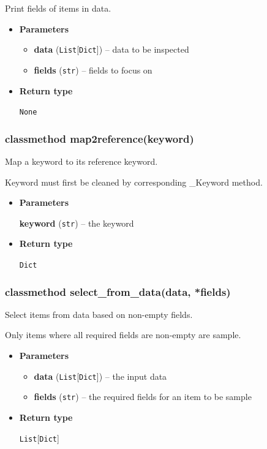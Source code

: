 Print fields of items in data.

\begin{itemize}
\item
  \textbf{Parameters}

  \begin{itemize}
  \item
    \textbf{data} (\texttt{List}{[}\texttt{Dict}{]}) -- data to be
    inspected
  \item
    \textbf{fields} (\texttt{str}) -- fields to focus on
  \end{itemize}
\item
  \textbf{Return type}

  \texttt{None}
\end{itemize}

\hypertarget{classmethod-map2referencekeyword}{%
\subsubsection{classmethod
map2reference(keyword)}\label{classmethod-map2referencekeyword}}

Map a keyword to its reference keyword.

Keyword must first be cleaned by corresponding \_Keyword method.

\begin{itemize}
\item
  \textbf{Parameters}

  \textbf{keyword} (\texttt{str}) -- the keyword
\item
  \textbf{Return type}

  \texttt{Dict}
\end{itemize}

\hypertarget{classmethod-select_from_datadata-fields}{%
\subsubsection{classmethod select\_from\_data(data,
*fields)}\label{classmethod-select_from_datadata-fields}}

Select items from data based on non-empty fields.

Only items where all required fields are non-empty are sample.

\begin{itemize}
\item
  \textbf{Parameters}

  \begin{itemize}
  \item
    \textbf{data} (\texttt{List}{[}\texttt{Dict}{]}) -- the input data
  \item
    \textbf{fields} (\texttt{str}) -- the required fields for an item to
    be sample
  \end{itemize}
\item
  \textbf{Return type}

  \texttt{List}{[}\texttt{Dict}{]}
\end{itemize}

